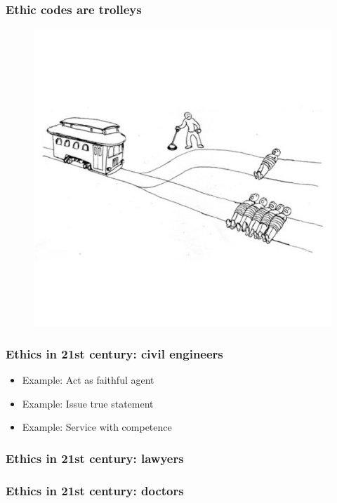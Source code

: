 \begin{frame}[fragile]
\frametitle{Ethic codes are trolleys}

\begin{figure}
\includegraphics[scale=0.25]{trolley}
\end{figure}

\end{frame}



\begin{frame}[fragile]
\frametitle{Ethics in 21st century: civil engineers}

\begin{itemize}
\item Example: Act as faithful agent
\item Example: Issue true statement
\item Example: Service with competence
\end{itemize}

\end{frame}

\begin{frame}[fragile]
\frametitle{Ethics in 21st century: lawyers}


\end{frame}

\begin{frame}[fragile]
\frametitle{Ethics in 21st century: doctors}



\end{frame}

